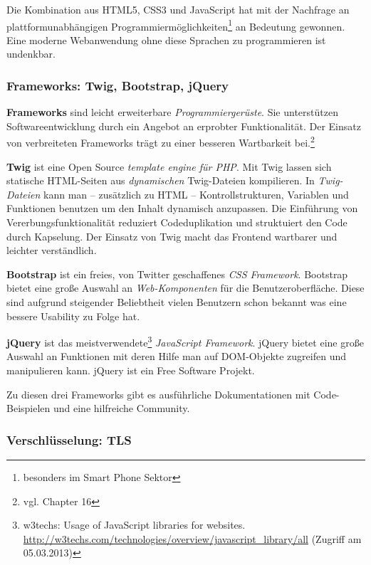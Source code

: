 \documentclass[12pt,a4paper,pointednumbers,abstracton]{scrartcl}
\begin{document}
Die Kombination aus HTML5, CSS3 und JavaScript hat mit der Nachfrage an plattformunabhängigen Programmiermöglichkeiten\footnote{besonders im Smart Phone Sektor} an Bedeutung gewonnen.
Eine moderne Webanwendung ohne diese Sprachen zu programmieren ist undenkbar.

\subsubsection{Frameworks: Twig, Bootstrap, jQuery}

\textbf{Frameworks} sind leicht erweiterbare \emph{Programmiergerüste}.
Sie unterstützen Softwareentwicklung durch ein Angebot an erprobter Funktionalität.
Der Einsatz von verbreiteten Frameworks trägt zu einer besseren Wartbarkeit bei.\footnote{vgl. \cite{Som10} Chapter 16}

\textbf{Twig} ist eine Open Source \emph{template engine für PHP}.
Mit Twig lassen sich statische HTML-Seiten aus \emph{dynamischen} Twig-Dateien kompilieren.
In \emph{Twig-Dateien} kann man -- zusätzlich zu HTML -- Kontrollstrukturen, Variablen und Funktionen benutzen um den Inhalt dynamisch anzupassen.
Die Einführung von Vererbungsfunktionalität reduziert Codeduplikation und struktuiert den Code durch Kapselung.
Der Einsatz von Twig macht das Frontend wartbarer und leichter verständlich.

\textbf{Bootstrap} ist ein freies, von Twitter geschaffenes \emph{CSS Framework}.
Bootstrap bietet eine große Auswahl an \emph{Web-Komponenten} für die Benutzeroberfläche.
Diese sind aufgrund steigender Beliebtheit vielen Benutzern schon bekannt was eine bessere Usability zu Folge hat.

\textbf{jQuery} ist das meistverwendete\footnote{w3techs: Usage of JavaScript libraries for websites. \url{http://w3techs.com/technologies/overview/javascript_library/all} (Zugriff am 05.03.2013)} \emph{JavaScript Framework}.
jQuery bietet eine große Auswahl an Funktionen mit deren Hilfe man auf DOM-Objekte zugreifen und manipulieren kann.
jQuery ist ein Free Software Projekt.

Zu diesen drei Frameworks gibt es ausführliche Dokumentationen mit Code-Beispielen und eine hilfreiche Community.

\subsubsection{Verschlüsselung: TLS}
\label{sec:oauth-infrz/tls}
\end{document}

